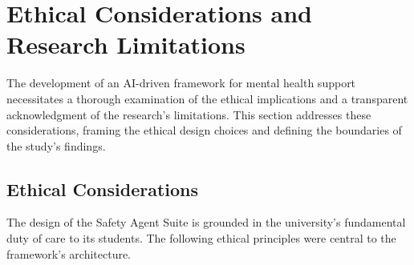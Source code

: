 \section{Ethical Considerations and Research Limitations}

The development of an AI-driven framework for mental health support necessitates a thorough examination of the ethical implications and a transparent acknowledgment of the research's limitations. This section addresses these considerations, framing the ethical design choices and defining the boundaries of the study's findings.

\subsection{Ethical Considerations}

The design of the Safety Agent Suite is grounded in the university's fundamental duty of care to its students. The following ethical principles were central to the framework's architecture.

